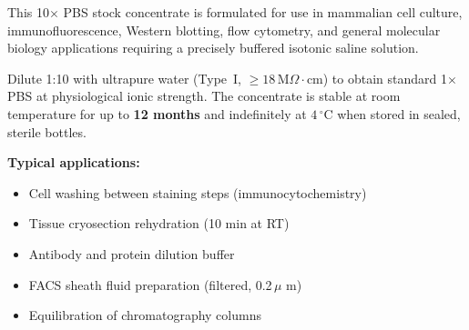 \documentclass[10pt,a4paper]{article}
\begin{document}
\noindent
\begin{minipage}[t]{0.62\linewidth}
  \begin{tcolorbox}[basebox, title={\faInfoCircle\enskip Purpose \& Scope}]
    \small\color{NexaText}
    This 10$\times$ PBS stock concentrate is formulated for use in mammalian cell
    culture, immunofluorescence, Western blotting, flow cytometry, and general
    molecular biology applications requiring a precisely buffered isotonic saline
    solution.

    \medskip
    Dilute 1:10 with ultrapure water (Type~I, $\geq 18\,\text{M}\Omega\cdot\text{cm}$)
    to obtain standard 1$\times$ PBS at physiological ionic strength. The concentrate
    is stable at room temperature for up to \textbf{12 months} and indefinitely
    at $4\,^{\circ}$C when stored in sealed, sterile bottles.

    \medskip
    \textbf{Typical applications:}
    \begin{itemize}[leftmargin=5mm, itemsep=1pt, topsep=1pt]
      \item Cell washing between staining steps (immunocytochemistry)
      \item Tissue cryosection rehydration (10 min at RT)
      \item Antibody and protein dilution buffer
      \item FACS sheath fluid preparation (filtered, 0.2\,\ensuremath{\mu} m)
      \item Equilibration of chromatography columns
    \end{itemize}
  \end{tcolorbox}
\end{minipage}%
\hfill
\end{document}
